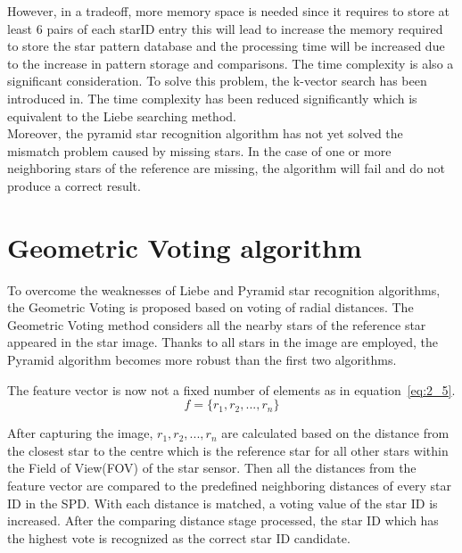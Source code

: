 \noindent However, in a tradeoff, more memory space is needed since it requires to store at least 6 pairs of each starID entry this will lead to increase the memory required to store the star pattern database and the processing time will be increased due to the increase in pattern storage and comparisons. The time complexity is also a significant consideration. To solve this problem, the k-vector search has been introduced in\cite{citation-241677739,citation-26584290}. The time complexity has been reduced significantly which is equivalent to the Liebe searching method. \\

\noindent Moreover, the pyramid star recognition algorithm has not yet solved the mismatch problem caused by missing stars. In the case of one or more neighboring stars of the reference are missing, the algorithm will fail and do not produce a correct result. \\

\section{Geometric Voting algorithm}

To overcome the weaknesses of Liebe and Pyramid star recognition algorithms, the Geometric Voting is proposed based on voting of radial distances\cite{edseee.456019820080101}. The Geometric Voting method considers all the nearby stars of the reference star appeared in the star image. Thanks to all stars in the image are employed, the Pyramid algorithm becomes more robust than the first two algorithms.


\noindent The feature vector is now not a fixed number of elements as in equation~\ref{eq:2_5}.
\begin{equation}
	f = \{r_1, r_2, ...,r_n\}
	\label{eq:2_5}
\end{equation}

\noindent After capturing the image, $r_1, r_2,...,r_n$ are calculated based on the distance from the closest star to the centre which is the reference star for all other stars within the Field of View(FOV) of the star sensor. Then all the distances from the feature vector are compared to the predefined neighboring distances of every star ID in the SPD. With each distance is matched, a voting value of the star ID is increased. After the comparing distance stage processed, the star ID which has the highest vote is recognized as the correct star ID candidate. \\

